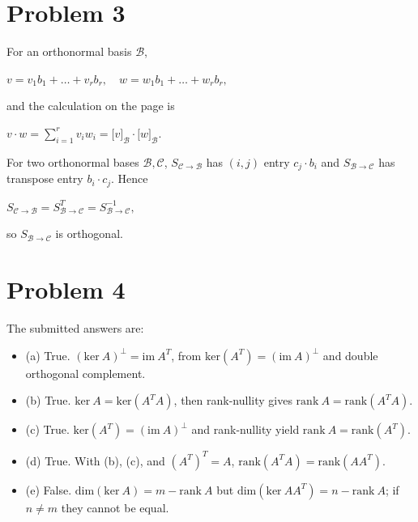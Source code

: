 \section{Problem 3}

For an orthonormal basis \(\mathcal{B}\),

\(v = v_{1}b_{1} + \ldots + v_{r}b_{r},\quad w = w_{1}b_{1} + \ldots + w_{r}b_{r},\)

and the calculation on the page is

\(v \cdot w = \sum_{i = 1}^{r}v_{i}w_{i} = \lbrack v\rbrack_{\mathcal{B}} \cdot \lbrack w\rbrack_{\mathcal{B}}.\)

For two orthonormal bases \(\mathcal{B},\mathcal{C}\), \(S_{\mathcal{C}\rightarrow\mathcal{B}}\) has \(\left( {i,j} \right)\) entry \(c_{j} \cdot b_{i}\) and \(S_{\mathcal{B}\rightarrow\mathcal{C}}\) has transpose entry \(b_{i} \cdot c_{j}\). Hence

\(S_{\mathcal{C}\rightarrow\mathcal{B}} = S_{\mathcal{B}\rightarrow\mathcal{C}}^{T} = S_{\mathcal{B}\rightarrow\mathcal{C}}^{- 1},\)

so \(S_{\mathcal{B}\rightarrow\mathcal{C}}\) is orthogonal.

\section{Problem 4}

The submitted answers are:

\begin{itemize}
\tightlist
\item
  (a) True. \(\left( {\text{ker}\ A} \right)^{\perp} = \text{im}\ A^{T}\), from \(\text{ker}\left( A^{T} \right) = \left( {\text{im}\ A} \right)^{\perp}\) and double orthogonal complement.
\item
  (b) True. \(\text{ker}\ A = \text{ker}\left( {A^{T}A} \right)\), then rank-nullity gives \(\text{rank}\ A = \text{rank}\left( {A^{T}A} \right)\).
\item
  (c) True. \(\text{ker}\left( A^{T} \right) = \left( {\text{im}\ A} \right)^{\perp}\) and rank-nullity yield \(\text{rank}\ A = \text{rank}\left( A^{T} \right)\).
\item
  (d) True. With (b), (c), and \(\left( A^{T} \right)^{T} = A\), \(\text{rank}\left( {A^{T}A} \right) = \text{rank}\left( {AA^{T}} \right)\).
\item
  (e) False. \(\text{dim}\left( {\text{ker}\ A} \right) = m - \text{rank}\ A\) but \(\text{dim}\left( {\text{ker}\ AA^{T}} \right) = n - \text{rank}\ A\); if \(n \neq m\) they cannot be equal.
\end{itemize}

